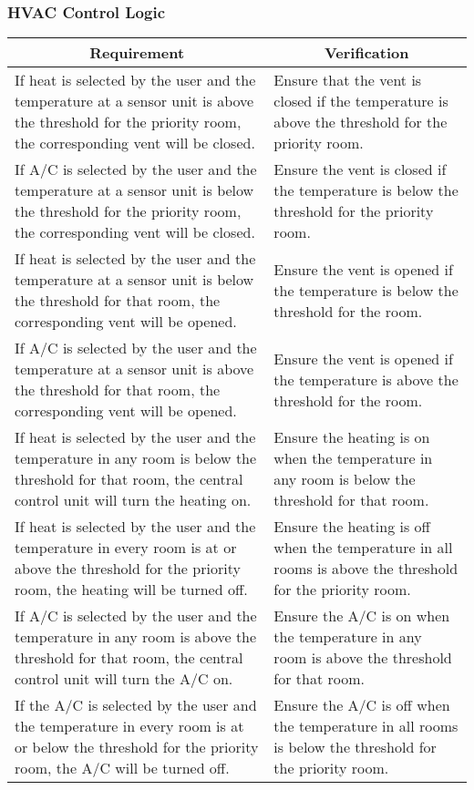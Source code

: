 \subsubsection{HVAC Control Logic}
\begin{tabular}{|p{\mytabwidth}|p{\mytabwidth}|}
\hline
\multicolumn{1}{|c|}{Requirement} & \multicolumn{1}{|c|}{Verification} \\
\hline\hline
If heat is selected by the user and the temperature at a sensor unit is above the threshold for the priority room, the corresponding vent will be closed. &
Ensure that the vent is closed if the temperature is above the threshold for the priority room. \\
\hline
If A/C is selected by the user and the temperature at a sensor unit is below the threshold for the priority room, the corresponding vent will be closed. &
Ensure the vent is closed if the temperature is below the threshold for the priority room. \\
\hline
If heat is selected by the user and the temperature at a sensor unit is below the threshold for that room, the corresponding vent will be opened. &
Ensure the vent is opened if the temperature is below the threshold for the room. \\
\hline
If A/C is selected by the user and the temperature at a sensor unit is above the threshold for that room, the corresponding vent will be opened. &
Ensure the vent is opened if the temperature is above the threshold for the room. \\
\hline
If heat is selected by the user and the temperature in any room is below the threshold for that room, the central control unit will turn the heating on. &
Ensure the heating is on when the temperature in any room is below the threshold for that room. \\
\hline
If heat is selected by the user and the temperature in every room is at or above the threshold for the priority room, the heating will be turned off. &
Ensure the heating is off when the temperature in all rooms is above the threshold for the priority room. \\
\hline
If A/C is selected by the user and the temperature in any room is above the threshold for that room, the central control unit will turn the A/C on. &
Ensure the A/C is on when the temperature in any room is above the threshold for that room. \\
\hline
If the A/C is selected by the user and the temperature in every room is at or below the threshold for the priority room, the A/C will be turned off. &
Ensure the A/C is off when the temperature in all rooms is below the threshold for the priority room. \\
\hline
\end{tabular}


